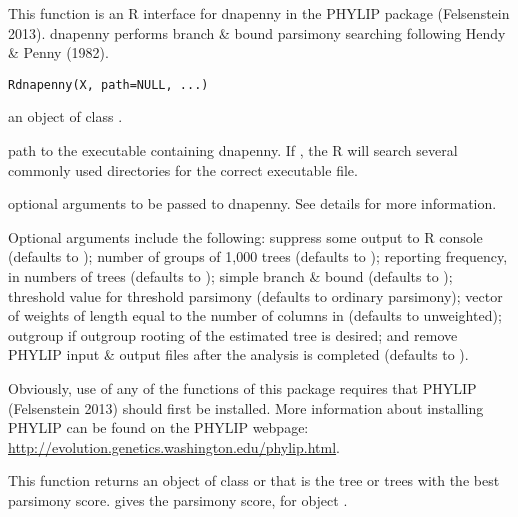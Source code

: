 \documentclass[a4paper]{book}
\begin{document}
%
\begin{Description}\relax
This function is an R interface for dnapenny in the PHYLIP package (Felsenstein 2013). dnapenny performs branch \& bound parsimony searching following Hendy \& Penny (1982).
\end{Description}
%
\begin{Usage}
\begin{verbatim}
Rdnapenny(X, path=NULL, ...)
\end{verbatim}
\end{Usage}
%
\begin{Arguments}
\begin{ldescription}
\item[\code{X}] an object of class .
\item[\code{path}] path to the executable containing dnapenny. If , the R will search several commonly used directories for the correct executable file.
\item[\code{...}] optional arguments to be passed to dnapenny. See details for more information.
\end{ldescription}
\end{Arguments}
%
\begin{Details}\relax
Optional arguments include the following:  suppress some output to R console (defaults to );  number of groups of 1,000 trees (defaults to );  reporting frequency, in numbers of trees (defaults to );  simple branch \& bound (defaults to );  threshold value for threshold parsimony (defaults to ordinary parsimony);  vector of weights of length equal to the number of columns in  (defaults to unweighted);  outgroup if outgroup rooting of the estimated tree is desired; and  remove PHYLIP input \& output files after the analysis is completed (defaults to ).

Obviously, use of any of the functions of this package requires that PHYLIP (Felsenstein 2013) should first be installed. More information about installing PHYLIP can be found on the PHYLIP webpage: \url{http://evolution.genetics.washington.edu/phylip.html}.
\end{Details}
%
\begin{Value}
This function returns an object of class  or  that is the tree or trees with the best parsimony score.  gives the parsimony score, for  object .
\end{Value}
\end{document}
